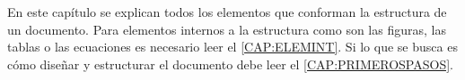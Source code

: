 En este capítulo se explican todos los elementos que conforman la estructura de un documento. Para elementos internos a la estructura como son las figuras, las tablas o las ecuaciones es necesario leer el \cref{CAP:ELEMINT}. Si lo que se busca es cómo diseñar y estructurar el documento debe leer el \cref{CAP:PRIMEROSPASOS}.

